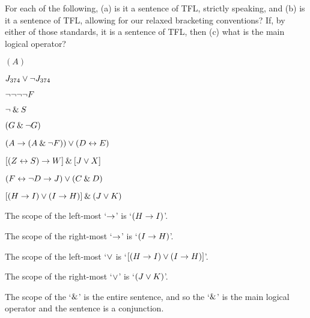 \problempart
\label{pr.wiffTFL}
For each of the following, (a) is it a sentence of TFL, strictly speaking, and (b) is it a sentence of TFL, allowing for our relaxed bracketing conventions? If, by either of those standards, it is a sentence of TFL, then (c) what is the main logical operator?
\begin{earg}
\item $(A)$\hfill {}
\medskip

\item $J_{374} \vee {\neg} J_{374}$ \hfill {}
\medskip

\item ${\neg} {\neg} {\neg} {\neg} F$ \hfill {}
\medskip

\item ${\neg} \mathbin{\&} S$\hfill {}
\medskip

\item $(G \mathbin{\&} {\neg} G)$\hfill {}
\medskip

\item $(A \rightarrow (A \mathbin{\&} {\neg} F)) \vee (D \leftrightarrow E)$\hfill {}
\medskip

\item $[(Z \leftrightarrow S) \rightarrow W] \mathbin{\&} [J \vee X]$\hfill {}
\medskip

\item $(F \leftrightarrow {\neg} D \rightarrow J) \vee (C \mathbin{\&} D)$\hfill {}
\medskip
\end{earg}



\problempart $[(H \rightarrow I) \vee (I \rightarrow H)] \mathbin{\&} (J \vee K)$\medskip

\noindent The scope of the left-most `$\rightarrow$' is `$(H \rightarrow I)$'. 

\noindent The scope of the right-most `$\rightarrow$' is `$(I \rightarrow H)$'. 

\noindent The scope of the left-most `$\vee$ is `$[(H \rightarrow I) \vee (I \rightarrow H)]$'.

\noindent The scope of the right-most `$\vee$' is `$(J \vee K)$'.

\noindent The scope of the `$\mathbin{\&}$' is the entire sentence, and so the `$\mathbin{\&}$' is the main logical operator and the sentence is a conjunction.


